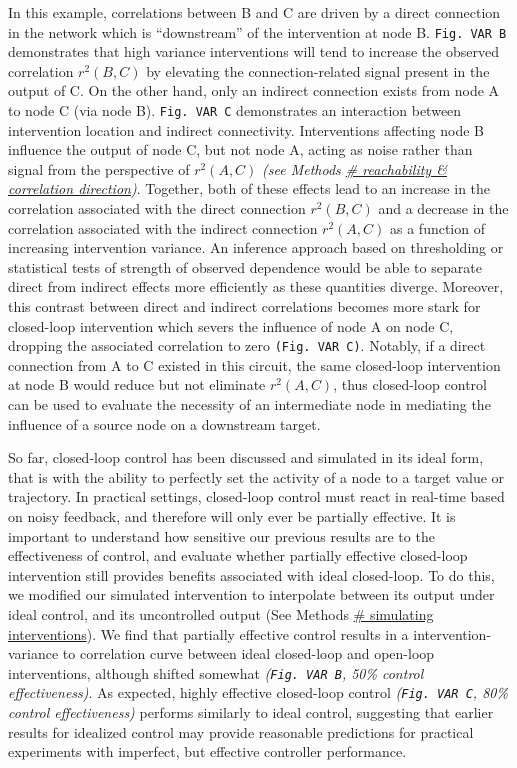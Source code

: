 \documentclass{article}
\begin{document}
In this example, correlations between B and C are driven by a direct connection in the network which is ``downstream'' of the intervention at node B. \texttt{Fig.\ VAR\ B} demonstrates that high variance interventions will tend to increase the observed correlation
\(r^2(B,C)\) by elevating the connection-related signal present in the output of C. On the other hand, only an indirect connection exists from node A to node C (via node B). \texttt{Fig.\ VAR\ C} demonstrates an interaction between intervention location and indirect connectivity. Interventions affecting node B influence the output of node C, but not node A, acting as noise rather than signal from the perspective of
\(r^2(A,C)\) \emph{(see Methods
\href{/section_content/methods_coreach_sign.md}{\# reachability \&
correlation direction})}. Together, both of these effects lead to an increase in the correlation associated with the direct connection
\(r^2(B,C)\) and a decrease in the correlation associated with the indirect connection \(r^2(A,C)\) as a function of increasing intervention variance. An inference approach based on thresholding or statistical tests of strength of observed dependence would be able to separate direct from indirect effects more efficiently as these quantities diverge. Moreover, this contrast between direct and indirect correlations becomes more stark for closed-loop intervention which severs the influence of node A on node C, dropping the associated correlation to zero \texttt{(Fig.\ VAR\ C)}. Notably, if a direct connection from A to C existed in this circuit, the same closed-loop intervention at node B would reduce but not eliminate \(r^2(A,C)\), thus closed-loop control can be used to evaluate the necessity of an intermediate node in mediating the influence of a source node on a downstream target.

So far, closed-loop control has been discussed and simulated in its ideal form, that is with the ability to perfectly set the activity of a node to a target value or trajectory. In practical settings, closed-loop control must react in real-time based on noisy feedback, and therefore will only ever be partially effective. It is important to understand how sensitive our previous results are to the effectiveness of control, and evaluate whether partially effective closed-loop intervention still provides benefits associated with ideal closed-loop. To do this, we modified our simulated intervention to interpolate between its output under ideal control, and its uncontrolled output (See Methods
\href{/section_content/methods_interventions.md}{\# simulating interventions}). We find that partially effective control results in a intervention-variance to correlation curve between ideal closed-loop and open-loop interventions, although shifted somewhat
\emph{(\texttt{Fig.\ VAR\ B}, 50\% control effectiveness)}. As expected, highly effective closed-loop control \emph{(\texttt{Fig.\ VAR\ C}, 80\%
control effectiveness)} performs similarly to ideal control, suggesting that earlier results for idealized control may provide reasonable predictions for practical experiments with imperfect, but effective controller performance.
\end{document}
